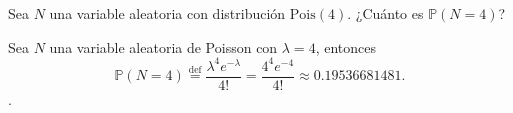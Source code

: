 \question
	Sea $N$ una variable aleatoria con distribución $\mathrm{Pois}(4)$. ¿Cuánto es $\mathds{P}\left(N=4\right)$?

	\begin{solutionordottedlines}
		Sea $N$ una variable aleatoria de Poisson con $\lambda=4$, entonces
		\begin{equation*}
			\mathds{P}\left(N=4\right)\stackrel{\text{def}}{=}\frac{\lambda^{4}e^{-\lambda}}{4!}=\frac{4^{4}e^{-4}}{4!}\approx\num{0.19536681481}.
		\end{equation*}.
	\end{solutionordottedlines}